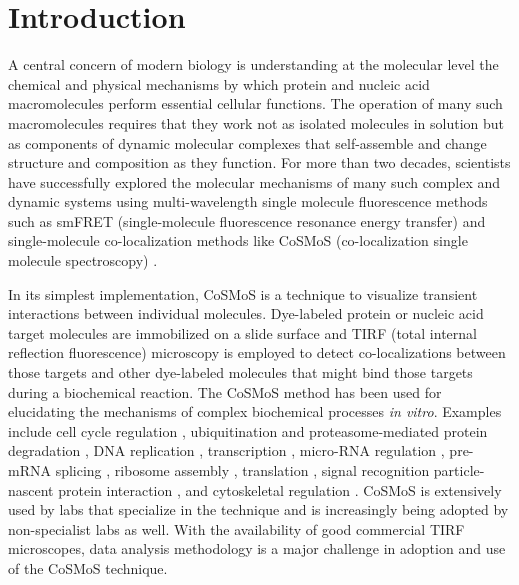 \section{Introduction}

A central concern of modern biology is understanding at the molecular level the chemical and physical mechanisms by which protein and nucleic acid macromolecules  perform essential cellular functions.  The operation of many such macromolecules requires that they work not as isolated molecules in solution but as components of dynamic molecular complexes that self-assemble and change structure and composition as they function.  For more than  two decades, scientists have successfully explored the molecular mechanisms of many such complex and dynamic systems using multi-wavelength single molecule fluorescence methods such as smFRET (single-molecule fluorescence resonance energy transfer) \cite{Roy2008-fo} and single-molecule co-localization methods like CoSMoS (co-localization single molecule spectroscopy) \cite{Larson2014-os, Van_Oijen2011-ig}.

In its simplest implementation, CoSMoS is a technique to visualize transient interactions between individual molecules.  Dye-labeled protein or nucleic acid target molecules are immobilized on a slide surface and TIRF (total internal reflection fluorescence) microscopy is employed to detect co-localizations between those targets and other dye-labeled molecules that might bind those targets during a biochemical reaction.  The CoSMoS method has been used for elucidating the mechanisms of complex biochemical processes \textit{in vitro}. Examples include cell cycle regulation \cite{Lu2015-eu}, ubiquitination and proteasome-mediated protein degradation \cite{Lu2015-jq}, DNA replication \cite{Geertsema2014-bt,Ticau2015-ib}, transcription \cite{Zhang2012-no,Friedman2012-if,Friedman2013-sf}, micro-RNA regulation \cite{Salomon2015-kq}, pre-mRNA splicing \cite{Shcherbakova2013-bi, Krishnan2013-fy, Warnasooriya2014-ls}, ribosome assembly \cite{Kim2014-zc}, translation \cite{Wang2015-tt,Tsai2014-mi,OLeary2013-wo}, signal recognition particle-nascent protein interaction \cite{Noriega2014-vj}, and cytoskeletal regulation \cite{Smith2013-qj,Breitsprecher2012-mj}. CoSMoS is extensively used by labs that specialize in the technique and is increasingly being adopted by non-specialist labs as well. With the availability of good commercial TIRF microscopes, data analysis methodology is a major challenge in adoption and use of the CoSMoS technique.

